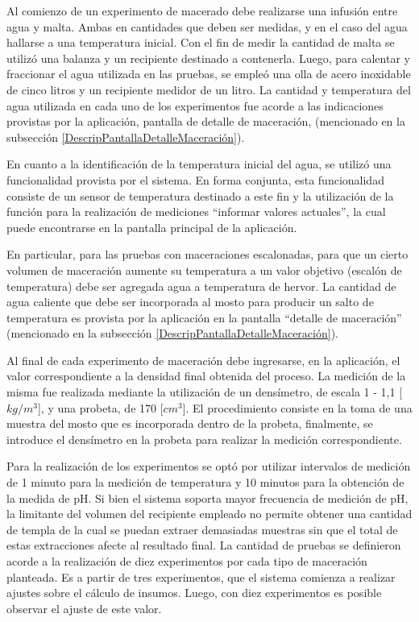         \par Al comienzo de un experimento de macerado debe realizarse una infusión entre agua y malta. Ambas en cantidades que deben ser medidas, y en el caso del agua hallarse a una temperatura inicial. Con el fin de medir la cantidad de malta se utilizó una balanza y un recipiente destinado a contenerla. Luego, para calentar y fraccionar el agua utilizada en las pruebas, se empleó una olla de acero inoxidable de cinco litros y un recipiente medidor de un litro. La cantidad y temperatura del agua utilizada en cada uno de los experimentos fue acorde a las indicaciones provistas por la aplicación, pantalla de detalle de maceración, (mencionado en la subsección \ref{DescripPantallaDetalleMaceración}).
        
        \par En cuanto a la identificación de la temperatura inicial del agua, se utilizó una funcionalidad provista por el sistema. En forma conjunta, esta funcionalidad consiste de un sensor de temperatura destinado a este fin y la utilización de la función para la realización de mediciones ``informar valores actuales'', la cual puede encontrarse en la pantalla principal de la aplicación.
        
        \par En particular, para las pruebas con maceraciones escalonadas, para que un cierto volumen de maceración aumente su temperatura a un valor objetivo (escalón de temperatura) debe ser agregada agua a temperatura de hervor. La cantidad de agua caliente que debe ser incorporada al mosto para producir un salto de temperatura es provista por la aplicación en la pantalla ``detalle de maceración'' (mencionado en la subsección \ref{DescripPantallaDetalleMaceración}).
        
        \par Al final de cada experimento de maceración debe ingresarse, en la aplicación, el valor correspondiente a la densidad final obtenida del proceso. La medición de la misma fue realizada mediante la utilización de un densímetro, de escala 1 - 1,1 [$kg/m^3$], y una probeta, de 170 [$cm^3$]. El procedimiento consiste en la toma de una muestra del mosto que es incorporada dentro de la probeta, finalmente, se introduce el densímetro en la probeta para realizar la medición correspondiente.
        
        \par Para la realización de los experimentos se optó por utilizar intervalos de medición de 1 minuto para la medición de temperatura y 10 minutos para la obtención de la medida de pH. Si bien el sistema soporta mayor frecuencia de medición de pH, la limitante del volumen del recipiente empleado no permite obtener una cantidad de templa de la cual se puedan extraer demasiadas muestras sin que el total de estas extracciones afecte al resultado final. La cantidad de pruebas se definieron acorde a la realización de diez experimentos por cada tipo de maceración planteada. Es a partir de tres experimentos, que el sistema comienza a realizar ajustes sobre el cálculo de insumos. Luego, con diez experimentos es posible observar el ajuste de este valor.
        
